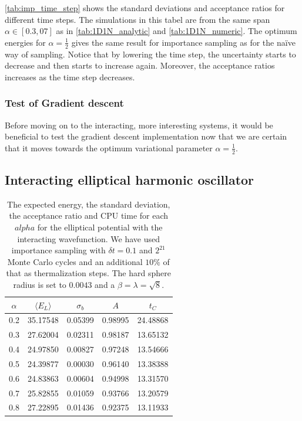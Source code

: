 \documentclass[
    a4paper, aps, twocolumn, floatfix, superscriptaddress, nofootinbib]{revtex4-1}
\newcommand{\1}{\mathds{1}}
\begin{document}
	\autoref{tab:imp_time_step} shows the standard deviations and acceptance ratios for different time steps. The
	simulations in this tabel are from the same span $\alpha \in [0.3, 07]$ as in \autoref{tab:1D1N_analytic} and
	\autoref{tab:1D1N_numeric}. The optimum energies for $\alpha = \frac{1}{2}$ gives the same result for importance
	sampling as for the naïve way of sampling. Notice that by lowering the time step, the uncertainty starts to decrease
	and then starts to increase again. Moreover, the acceptance ratios increases as the time step decreases.
	
	\subsubsection{Test of Gradient descent}
	
	Before moving on to the interacting, more interesting systems, it would be beneficial to test the gradient descent implementation
	now that we are certain that it moves towards the optimum variational parameter $\alpha = \frac{1}{2}$.

\subsection{Interacting elliptical harmonic oscillator}
         \begin{table}
             \caption{The expected energy, the standard
             deviation, the acceptance ratio and CPU time for each $alpha$
             for the elliptical potential with the interacting wavefunction. We
             have used importance sampling with $\delta t = 0.1$ and $2^{21}$
             Monte Carlo cycles and an additional $10\%$ of that as
             thermalization steps. The hard sphere radius is set to $0.0043$ and
             a $\beta = \lambda = \sqrt{8}$.}
             \centering
             \begin{ruledtabular}
                 \begin{tabular}{ccccc}
                     $\alpha$ & $\langle  E_L\rangle$ & $\sigma_b$
                     &$A$&$t_C$ \\
                     \hline
                     0.2&35.17548&0.05399&0.98995&24.48868\\
                     0.3&27.62004&0.02311&0.98187&13.65132\\
                     0.4&24.97850&0.00827&0.97248&13.54666\\
                     0.5&24.39877&0.00030&0.96140&13.38388\\
                     0.6&24.83863&0.00604&0.94998&13.31570\\
                     0.7&25.82855&0.01059&0.93766&13.20579\\
                     0.8&27.22895&0.01436&0.92375&13.11933\\
                 \end{tabular}
             \end{ruledtabular}
             \label{tab:10_interacting}
         \end{table}
 
\end{document}
